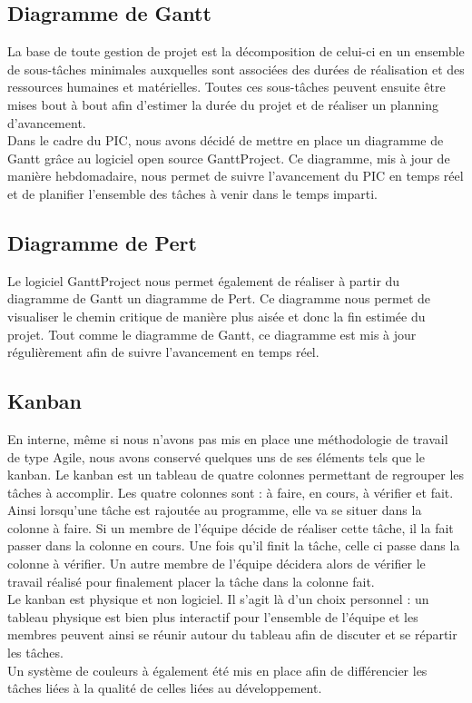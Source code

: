 \documentclass[asi]{picInsa}
\begin{document}
\subsection{Diagramme de Gantt}
La base de toute gestion de projet est la décomposition de celui-ci en un ensemble de sous-tâches minimales auxquelles sont associées des durées de réalisation et des ressources humaines et matérielles. Toutes ces sous-tâches peuvent ensuite être mises bout à bout afin d'estimer la durée du projet et de réaliser un planning d'avancement.\\
Dans le cadre du PIC, nous avons décidé de mettre en place un diagramme de Gantt grâce au logiciel open source GanttProject. Ce diagramme, mis à jour de manière hebdomadaire, nous permet de suivre l'avancement du PIC en temps réel et de planifier l'ensemble des tâches à venir dans le temps imparti.

\subsection{Diagramme de Pert}
Le logiciel GanttProject nous permet également de réaliser à partir du diagramme de Gantt un diagramme de Pert. Ce diagramme nous permet de visualiser le chemin critique de manière plus aisée et donc la fin estimée du projet. Tout comme le diagramme de Gantt, ce diagramme est mis à jour régulièrement afin de suivre l'avancement en temps réel.

\subsection{Kanban}
En interne, même si nous n'avons pas mis en place une méthodologie de travail de type Agile, nous avons conservé quelques uns de ses éléments tels que le kanban. Le kanban est un tableau de quatre colonnes permettant de regrouper les tâches à accomplir. Les quatre colonnes sont : à faire, en cours, à vérifier et fait. Ainsi lorsqu'une tâche est rajoutée au programme, elle va se situer dans la colonne à faire. Si un membre de l'équipe décide de réaliser cette tâche, il la fait passer dans la colonne en cours. Une fois qu'il finit la tâche, celle ci passe dans la colonne à vérifier. Un autre membre de l'équipe décidera alors de vérifier le travail réalisé pour finalement placer la tâche dans la colonne fait.\\
Le kanban est physique et non logiciel. Il s'agit là d'un choix personnel : un tableau physique est bien plus interactif pour l'ensemble de l'équipe et les membres peuvent ainsi se réunir autour du tableau afin de discuter et se répartir les tâches.\\
Un système de couleurs à également été mis en place afin de différencier les tâches liées à la qualité de celles liées au développement.
\end{document}
